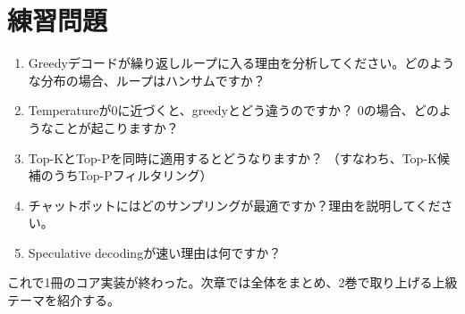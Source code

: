 \section{練習問題}

\begin{enumerate}
\item Greedyデコードが繰り返しループに入る理由を分析してください。どのような分布の場合、ループはハンサムですか？
\item Temperatureが0に近づくと、greedyとどう違うのですか？ 0の場合、どのようなことが起こりますか？
\item Top-KとTop-Pを同時に適用するとどうなりますか？ （すなわち、Top-K候補のうちTop-Pフィルタリング）
\item チャットボットにはどのサンプリングが最適ですか？理由を説明してください。
\item Speculative decodingが速い理由は何ですか？
\end{enumerate}

これで1冊のコア実装が終わった。次章では全体をまとめ、2巻で取り上げる上級テーマを紹介する。
